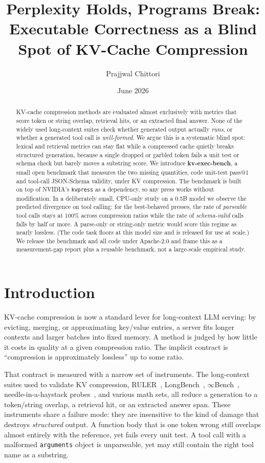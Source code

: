 \documentclass[11pt]{article}
\title{Perplexity Holds, Programs Break:\\ Executable Correctness as a Blind Spot of KV-Cache Compression}
\author{Prajjwal Chittori}
\affil{Independent Researcher \\ \texttt{prajjwalchittoriwork@gmail.com} \\ ORCID: \href{https://orcid.org/0009-0000-7410-8290}{0009-0000-7410-8290}}
\date{June 2026}
\begin{document}
\maketitle

\begin{abstract}
KV-cache compression methods are evaluated almost exclusively with metrics that score token or
string overlap, retrieval hits, or an extracted final answer. None of the widely used long-context
suites check whether generated output actually \emph{runs}, or whether a generated tool call is
\emph{well-formed}. We argue this is a systematic blind spot: lexical and retrieval metrics can stay
flat while a compressed cache quietly breaks structured generation, because a single dropped or
garbled token fails a unit test or schema check but barely moves a substring score. We introduce
\textbf{kv-exec-bench}, a small open benchmark that measures the two missing quantities, code
unit-test pass@1 and tool-call JSON-Schema validity, under KV compression. The benchmark is built on
top of NVIDIA's \texttt{kvpress} as a dependency, so any press works without modification. In a
deliberately small, CPU-only study on a 0.5B model we observe the predicted divergence on tool
calling: for the best-behaved presses, the rate of \emph{parseable} tool calls stays at $100\%$ across
compression ratios while the rate of \emph{schema-valid} calls falls by half or more. A parse-only or
string-only metric would score this regime as nearly lossless. (The code task floors at this model
size and is released for use at scale.) We release the benchmark and all code under Apache-2.0 and
frame this as a measurement-gap report plus a reusable benchmark, not a large-scale empirical study.
\end{abstract}

\section{Introduction}
\label{sec:intro}

KV-cache compression is now a standard lever for long-context LLM serving: by evicting, merging, or
approximating key/value entries, a server fits longer contexts and larger batches into fixed memory.
A method is judged by how little it costs in quality at a given compression ratio. The implicit
contract is ``compression is approximately lossless'' up to some ratio.

That contract is measured with a narrow set of instruments. The long-context suites used to validate
KV compression, RULER~\cite{hsieh2024ruler}, LongBench~\cite{bai2024longbench},
$\infty$Bench~\cite{zhang2024inftybench}, needle-in-a-haystack
probes~\cite{kamradt2023niah}, and various math sets, all reduce a generation to a token/string
overlap, a retrieval hit, or an extracted answer span. These instruments share a failure mode: they
are insensitive to the kind of damage that destroys \emph{structured} output. A function body that is
one token wrong still overlaps almost entirely with the reference, yet fails every unit test. A tool
call with a malformed \texttt{arguments} object is unparseable, yet may still contain the right tool
name as a substring.
\end{document}
